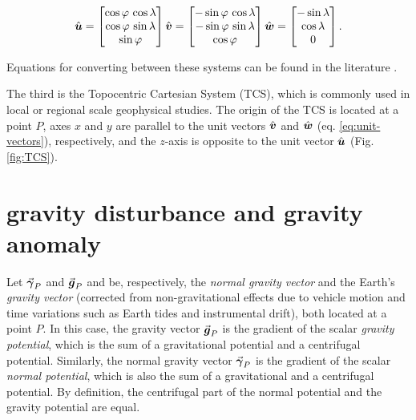 \documentclass[extra]{gji}
\newcommand{\versor}[1]{\hat{\mitbf{#1}}}
\renewcommand{\vector}[1]{\vec{\mitbf{#1}}}
\begin{document}
\begin{equation}
    \versor{u} =
    \begin{bmatrix}
        \cos\varphi \, \cos\lambda \\
        \cos\varphi \, \sin\lambda \\
        \sin\varphi
    \end{bmatrix}
    \versor{v} =
        \begin{bmatrix}
        -\sin\varphi \, \cos\lambda \\
        -\sin\varphi \, \sin\lambda \\
        \cos\varphi
    \end{bmatrix}
    \versor{w} =
    \begin{bmatrix}
        -\sin\lambda \\
        \cos\lambda \\
        0
    \end{bmatrix} .
    \label{eq:unit-vectors}
\end{equation}

\noindent Equations for converting between these systems can be found in
the literature \citep[e.g.,][]{heiskanen-moritz1967, torge2012,
bouman_etal2013}.

The third is the Topocentric Cartesian System (TCS),
which is commonly used in local or regional scale geophysical studies.
The origin of the TCS is located at a point $P$,
axes $x$ and $y$ are parallel to
the unit vectors $\versor{v}$ and $\versor{w}$
(eq. \ref{eq:unit-vectors}), respectively,
and the $z$-axis is opposite to the unit vector $\versor{u}$
(Fig. \ref{fig:TCS}).


\section{gravity disturbance and gravity anomaly}

Let $\vector{\gamma}_{P}$ and $\vector{g}_{P}$ and be, respectively,
the \textit{normal gravity vector} and the Earth's \textit{gravity vector}
(corrected from non-gravitational effects due to vehicle
motion and time variations such as Earth tides and instrumental drift),
both located at a point $P$.
In this case, the gravity vector $\vector{g}_{P}$ is the
gradient of the scalar \textit{gravity potential},
which is the sum of a gravitational potential and a centrifugal potential.
Similarly, the normal gravity vector $\vector{\gamma}_{P}$ is the
gradient of the scalar \textit{normal potential},
which is also the sum of a gravitational and a centrifugal potential.
By definition, the centrifugal part of
the normal potential and the gravity potential are equal.
\end{document}
